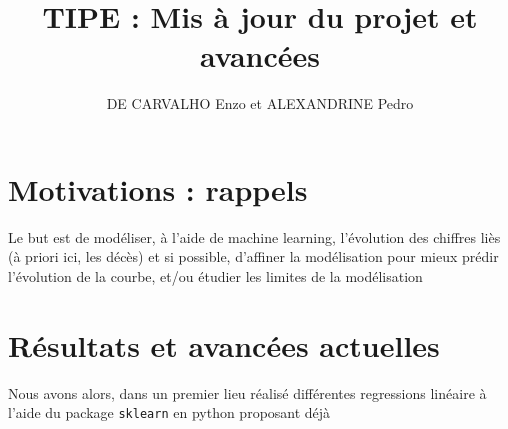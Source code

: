 \documentclass[a4paper,11pt]{article}
\title{TIPE : Mis à jour du projet et avancées}
\author{DE CARVALHO Enzo et ALEXANDRINE Pedro}
\begin{document}
\maketitle
\section{Motivations : rappels}
	Le but est de modéliser, à l'aide de machine learning, l'évolution des 
	chiffres liès (à priori ici, les décès) et si possible, d'affiner la 			modélisation pour mieux prédir l'évolution de la courbe, et/ou étudier 			les limites de la modélisation

\section{Résultats et avancées actuelles}
	Nous avons alors, dans un premier lieu réalisé différentes regressions
	linéaire à l'aide du package \texttt{sklearn} en python proposant déjà
	
\end{document}
